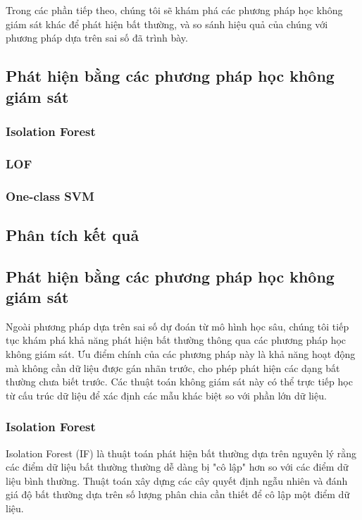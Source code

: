 Trong các phần tiếp theo, chúng tôi sẽ khám phá các phương pháp học không giám sát khác để phát hiện bất thường, và so sánh hiệu quả của chúng với phương pháp dựa trên sai số đã trình bày.
\subsection{Phát hiện bằng các phương pháp học không giám sát}
\subsubsection{Isolation Forest}
\subsubsection{LOF}
\subsubsection{One-class SVM}
\subsection{Phân tích kết quả}

\subsection{Phát hiện bằng các phương pháp học không giám sát}

Ngoài phương pháp dựa trên sai số dự đoán từ mô hình học sâu, chúng tôi tiếp tục khám phá khả năng phát hiện bất thường thông qua các phương pháp học không giám sát. Ưu điểm chính của các phương pháp này là khả năng hoạt động mà không cần dữ liệu được gán nhãn trước, cho phép phát hiện các dạng bất thường chưa biết trước. Các thuật toán không giám sát này có thể trực tiếp học từ cấu trúc dữ liệu để xác định các mẫu khác biệt so với phần lớn dữ liệu.

\subsubsection{Isolation Forest}

Isolation Forest (IF) là thuật toán phát hiện bất thường dựa trên nguyên lý rằng các điểm dữ liệu bất thường thường dễ dàng bị "cô lập" hơn so với các điểm dữ liệu bình thường. Thuật toán xây dựng các cây quyết định ngẫu nhiên và đánh giá độ bất thường dựa trên số lượng phân chia cần thiết để cô lập một điểm dữ liệu.

